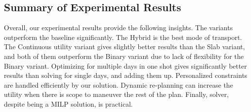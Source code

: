 \subsection{Summary of Experimental Results}

Overall, our experimental results provide the following insights.
The \trip variants outperform the baseline significantly.
The Hybrid is the best mode of transport.
The Continuous utility variant gives slightly better results than the Slab variant, and both of them outperform the Binary variant due to lack of flexibility for the Binary variant.
Optimizing for multiple days in one shot gives significantly better results than solving for single days, and adding them up.
Personalized constraints are handled efficiently by our \trip solution.
Dynamic re-planning can increase the utility when there is scope to maneuver the rest of the plan.
Finally, \trip solver, despite being a MILP solution, is practical.

